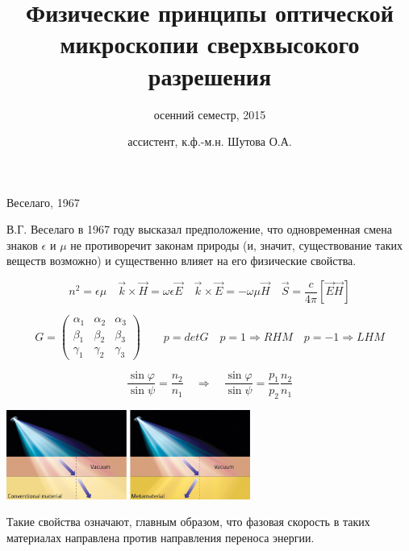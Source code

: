 \documentclass[9pt, compress, xcolor=table]{beamer}
\title{Физические принципы оптической микроскопии сверхвысокого разрешения}
\subtitle{осенний семестр, 2015}
\author{ассистент, к.ф.-м.н. Шутова О.А.}
\institute{МГУ им. М.В. Ломоносова, физический факультет}
\begin{document}
\maketitle


\begin{frame}{Веселаго, 1967}

{\scriptsize В.Г. Веселаго в 1967 году высказал предположение, что одновременная смена знаков
$\epsilon$ и $\mu$ не противоречит законам природы (и, значит, существование таких веществ
возможно) и существенно влияет на его физические свойства.
\begin{center}
\begin{equation*}
n^2 = \epsilon \mu \quad \vec k \times \vec H = \omega \epsilon \vec E
\quad \vec k \times \vec E = -\omega \mu \vec H \quad \vec S = \frac{c}{4 \pi}\left[\vec E \vec H\right]
\end{equation*}

\begin{equation*}G = \begin{pmatrix} \alpha_1 & \alpha_2 & \alpha_3\\
\beta_1 & \beta_2 & \beta_3\\ \gamma_1 & \gamma_2 & \gamma_3
\end{pmatrix} \qquad p = det G\quad p=1\Rightarrow RHM \quad p= -1\Rightarrow LHM
\end{equation*}

\begin{equation*}
\frac{\sin \varphi}{\sin \psi} = \frac{n_2}{n_1}
\quad \Rightarrow \quad\frac{\sin \varphi}{\sin \psi} = \frac{p_1}{p_2}\frac{n_2}{n_1}
\end{equation*}
\end{center}

\begin{center}
\includegraphics[width=0.6\textwidth]{neg_ref_1}
\end{center}
}
Такие свойства означают, главным образом, что фазовая скорость в таких материалах направлена против направления переноса энергии.


\end{frame}
\end{document}
